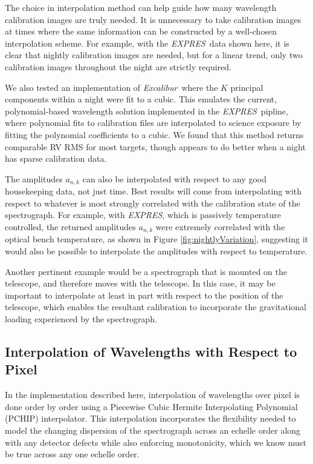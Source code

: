 \documentclass[modern]{aastex63}
\newcommand{\project}[1]{\textsl{#1}}
\newcommand{\name}{\project{Excalibur}}
\newcommand{\acronym}[1]{{\small{#1}}}
\newcommand{\expres}{\project{\acronym{EXPRES}}}
\begin{document}
The choice in interpolation method can help guide how many wavelength calibration images are truly needed.  It is unnecessary to take calibration images at times where the same information can be constructed by a well-chosen interpolation scheme.  For example, with the \expres\ data shown here, it is clear that nightly calibration images are needed, but for a linear trend, only two calibration images throughout the night are strictly required.

We also tested an implementation of \name\ where the $K$ principal components within a night were fit to a cubic.  This emulates the current, polynomial-based wavelength solution implemented in the \expres\ pipline, where polynomial fits to calibration files are interpolated to science exposure by fitting the polynomial coefficients to a cubic.  We found that this method returns comparable RV RMS for most targets, though appears to do better when a night has sparse calibration data.

The amplitudes $a_{n,k}$ can also be interpolated with respect to any good housekeeping data, not just time.  Best results will come from interpolating with respect to whatever is most strongly correlated with the calibration state of the spectrograph.  For example, with \expres, which is passively temperature controlled, the returned amplitudes $a_{n,k}$ were extremely correlated with the optical bench temperature, as shown in Figure \ref{fig:nightlyVariation}, suggesting it would also be possible to interpolate the amplitudes with respect to temperature.

Another pertinent example would be a spectrograph that is mounted on the telescope, and therefore moves with the telescope.  In this case, it may be important to interpolate at least in part with respect to the position of the telescope, which enables the resultant calibration to incorporate the gravitational loading experienced by the spectrograph.


\subsection{Interpolation of Wavelengths with Respect to Pixel}
\label{sec:choice_wvp}
In the implementation described here, interpolation of wavelengths over pixel  is done order by order using a Piecewise Cubic Hermite Interpolating Polynomial (PCHIP) interpolator.  This interpolation incorporates the flexibility needed to model the changing dispersion of the spectrograph across an echelle order along with any detector defects while also enforcing monotonicity, which we know must be true across any one echelle order.
\end{document}
